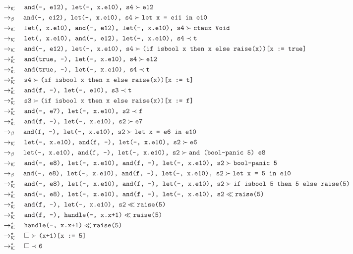 \documentclass{article}
\newcommand{\tx}[1]{\textcolor{Black} {\texttt{#1}}}
\newcommand{\es}{$\square$}
\newcommand{\pop}[2]{ \tx{#1} \succ \tx{#2}}
\newcommand{\push}[2]{ \tx{#1} \prec \tx{#2}}
\newcommand{\prop}[2]{\tx{#1} \ll \tx{#2}}
\newcommand{\kr}{\rightarrow_{\mathcal{K}} \quad}
\newcommand{\br}{\rightarrow_{\beta} \quad}
\newcommand{\krs}{\rightarrow_{\mathcal{K}}^{\star} \quad}
\begin{document}
\begin{enumerate}
\begin{align*}
        &\kr \pop{and(-, e12), let(-, x.e10), s4}{e12}\\
        &\br \pop{and(-, e12), let(-, x.e10), s4}{let x = e11 in e10}\\
        &\kr \pop{let(, x.e10), and(-, e12), let(-, x.e10), s4}{ctaux Void}\\
        &\kr \push{let(, x.e10), and(-, e12), let(-, x.e10), s4}{t}\\
        &\kr \pop{and(-, e12), let(-, x.e10), s4}{(if isbool x then x else raise(x))[x := true]}\\
        &\krs \pop{and(true, -), let(-, x.e10), s4}{e12}\\
        &\krs \push{and(true, -), let(-, x.e10), s4}{t}\\
        &\krs \pop{s4}{(if isbool x then x else raise(x))[x := t]}\\
        &\krs \push{and(f, -), let(-, e10), s3}{t}\\
        &\krs \pop{s3}{(if isbool x then x else raise(x))[x := f]}\\
        &\krs \push{and(-, e7), let(-, x.e10), s2}{f}\\
        &\krs \pop{and(f, -), let(-, x.e10), s2}{e7}\\
        &\br \pop{and(f, -), let(-, x.e10), s2}{let x = e6 in e10}\\
        &\kr \pop{let(-, x.e10), and(f, -), let(-, x.e10), s2}{e6}\\
        &\br \pop{let(-, x.e10), and(f, -), let(-, x.e10), s2}{and (bool-panic 5) e8}\\
        &\kr \pop{and(-, e8), let(-, x.e10), and(f, -), let(-, x.e10), s2}{bool-panic 5}\\
        &\br \pop{and(-, e8), let(-, x.e10), and(f, -), let(-, x.e10), s2}{let x = 5 in e10}\\
        &\krs \pop{and(-, e8), let(-, x.e10), and(f, -), let(-, x.e10), s2}{if isbool 5 then 5 else raise(5)}\\
        &\krs \prop{and(-, e8), let(-, x.e10), and(f, -), let(-, x.e10), s2}{raise(5)}\\
        &\krs \prop{and(f, -), let(-, x.e10), s2}{raise(5)}\\
        &\krs \prop{and(f, -), handle(-, x.x+1)}{raise(5)}\\
        &\krs \prop{handle(-, x.x+1)}{raise(5)}\\
        &\krs \pop{\es}{(x+1)[x := 5]}\\
        &\krs \push{\es}{6}
        \end{align*}


\end{enumerate}
\end{document}
